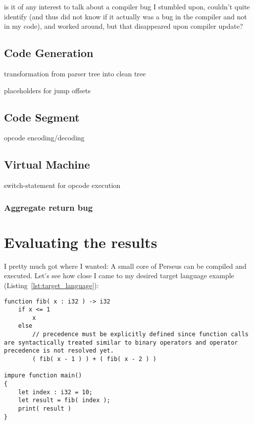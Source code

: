             is it of any interest to talk about a compiler bug I stumbled upon, couldn't quite identify (and thus did not know if it actually was a bug in the compiler and not in my code), and worked around, but that disappeared upon compiler update?
    
    \section{Code Generation}
    
        transformation from parser tree into clean tree
    
        placeholders for jump offsets
        
    \section{Code Segment}
        
        opcode encoding/decoding
        
    \section{Virtual Machine}
        
        switch-statement for opcode execution
        
        \subsection{Aggregate return bug}


\chapter{Evaluating the results}

I pretty much got where I wanted: A small core of Perseus can be compiled and executed. Let's see how close I came to my desired target language example (Listing~\ref{lst:target_language}):

\lstperseus
\begin{lstlisting}[caption={Actual resulting language example}]
function fib( x : i32 ) -> i32
    if x <= 1
        x
    else
    	// precedence must be explicitly defined since function calls are syntactically treated similar to binary operators and operator precedence is not resolved yet.
        ( fib( x - 1 ) ) + ( fib( x - 2 ) )

impure function main()
{
	let index : i32 = 10;
	let result = fib( index );
	print( result )
}
\end{lstlisting}


